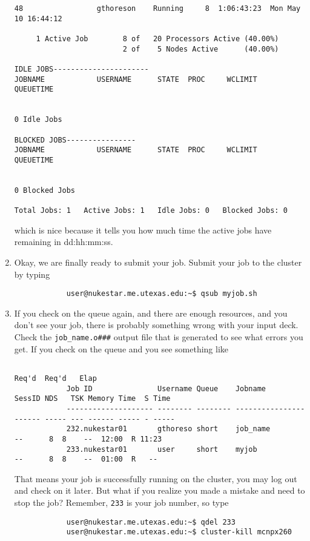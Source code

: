\documentclass[a4paper, 12pt]{article}
\begin{document}
\begin{enumerate}
{\begin{verbatim}
48                 gthoreson    Running     8  1:06:43:23  Mon May 10 16:44:12

     1 Active Job        8 of   20 Processors Active (40.00%)
                         2 of    5 Nodes Active      (40.00%)

IDLE JOBS----------------------
JOBNAME            USERNAME      STATE  PROC     WCLIMIT            QUEUETIME


0 Idle Jobs

BLOCKED JOBS----------------
JOBNAME            USERNAME      STATE  PROC     WCLIMIT            QUEUETIME


0 Blocked Jobs

Total Jobs: 1   Active Jobs: 1   Idle Jobs: 0   Blocked Jobs: 0
		\end{verbatim}
		}
		which is nice because it tells you how much time the active jobs have remaining in dd:hh:mm:ss.
	\item Okay, we are finally ready to submit your job. Submit your job to the cluster by typing
		\begin{verbatim}
			user@nukestar.me.utexas.edu:~$ qsub myjob.sh
		\end{verbatim}
	\item If you check on the queue again, and there are enough resources, and you don't see your job, there is probably something wrong with your input deck. Check the \verb+job_name.o###+ output file that is generated to see what errors you get. If you check on the queue and you see something like
	{\footnotesize
	\begin{verbatim}
			                                                                         Req'd  Req'd   Elap
			Job ID               Username Queue    Jobname          SessID NDS   TSK Memory Time  S Time
			-------------------- -------- -------- ---------------- ------ ----- --- ------ ----- - -----
			232.nukestar01       gthoreso short    job_name            --      8  8    --  12:00  R 11:23
			233.nukestar01       user     short    myjob               --      8  8    --  01:00  R   --
	\end{verbatim}
	}
	That means your job is successfully running on the cluster, you may log out and check on it later. But what if you realize you made a mistake and need to stop the job? Remember, \verb+233+ is your job number, so type
		\begin{verbatim}
			user@nukestar.me.utexas.edu:~$ qdel 233
			user@nukestar.me.utexas.edu:~$ cluster-kill mcnpx260
		\end{verbatim}

\end{enumerate}
\end{document}
